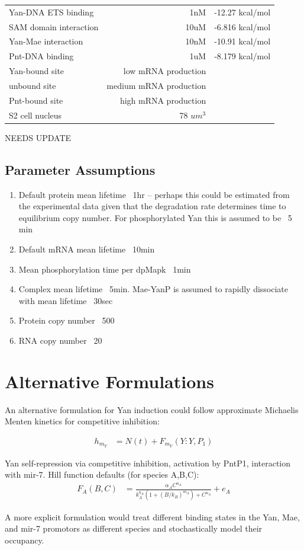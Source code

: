 \documentclass[12pt]{article}
\renewcommand{\(}{\left(}
\renewcommand{\)}{\right)}
\begin{document}
\begin{center}
\begin{tabular}{l | r | r}
	\hline
	Yan-DNA ETS binding & 1nM & -12.27 kcal/mol \\
	SAM domain interaction & 10uM & -6.816 kcal/mol \\
	Yan-Mae interaction & 10nM & -10.91 kcal/mol \\
	Pnt-DNA binding & 1uM & -8.179 kcal/mol \\
	Yan-bound site & low mRNA production & \\
	unbound site & medium mRNA production & \\
	Pnt-bound site & high mRNA production & \\
	S2 cell nucleus & 78 $um^3$ & \\
	\hline
\end{tabular}
\end{center}

NEEDS UPDATE

\subsection{Parameter Assumptions}

\begin{enumerate}
	\item Default protein mean lifetime ~1hr -- perhaps this could be estimated from the experimental data given that the degradation rate determines time to equilibrium copy number. For phosphorylated Yan this is assumed to be ~5 min
	\item Default mRNA mean lifetime ~10min
	\item Mean phosphorylation time per dpMapk ~1min
	\item Complex mean lifetime ~5min. Mae-YanP is assumed to rapidly dissociate with mean lifetime ~30sec
	\item Protein copy number ~500
	\item RNA copy number ~20
\end{enumerate}

\section{Alternative Formulations}

An alternative formulation for Yan induction could follow approximate Michaelis Menten kinetics for competitive inhibition:

\begin{align}
	h_{m_Y} &= N(t) + F_{m_Y}(Y:Y,P_1) \nonumber
\end{align}

Yan self-repression via competitive inhibition, activation by PntP1, interaction with mir-7. Hill function defaults (for species A,B,C):
	\begin{align*}
		F_A(B,C) &= \frac{\alpha_A C^{n_A}}{k_A^{n_A} (1 + (B/k_B)^{m_A}) + C^{n_A}} + e_A
	\end{align*}
	
A more explicit formulation would treat different binding states in the Yan, Mae, and mir-7 promotors as different species and stochastically model their occupancy. 
\end{document}

